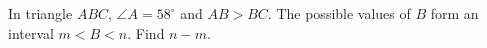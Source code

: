 In triangle $ABC$, $\angle A=58^\circ$ and $AB>BC$. The possible values of $B$ form an interval $m<B<n$. Find $n-m$.
